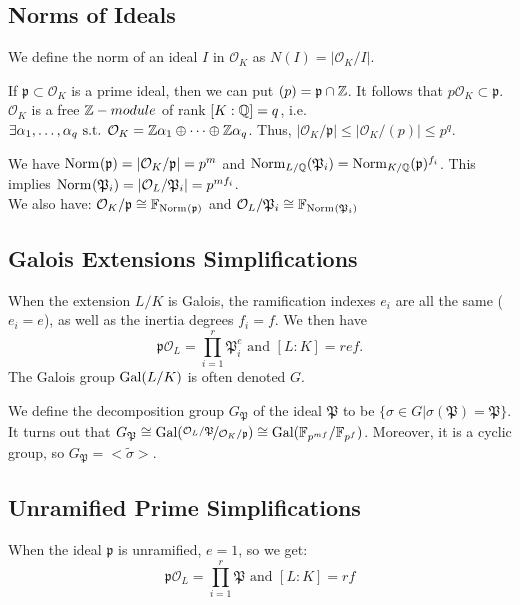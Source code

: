 \subsection{Norms of Ideals}
We define the norm of an ideal $I$ in $\mathcal{O}_K$ as $N(I)=|\mathcal{O}_K/I|$.

If $\mathfrak{p} \subset \mathcal{O}_K$ is a prime ideal, then we can put $(p)=\mathfrak{p} \cap \Z$.
It follows that $p\mathcal{O}_K \subset \mathfrak{p}$.
$\mathcal{O}_K$ is a free $\Z-module$ of rank $[K:\Q]=q$, i.e. $\exists \alpha_1,\dots,\alpha_q \text{ s.t. } \mathcal{O}_K=\Z \alpha_1 \oplus \cdots \oplus \Z \alpha_q$.
Thus, $|\mathcal{O}_K/\mathfrak{p}| \leq |\mathcal{O}_K/(p)| \leq p^q$.

We have 
$
\Norm{\mathfrak{p}} = |\mathcal{O}_K/\mathfrak{p}|=p^m
$
and 
$
\Norm[L/\Q]{\mathfrak{P}_i} = \Norm[K/\Q]{\mathfrak{p}}^{f_i}
$.
This implies 
$
\Norm{\mathfrak{P}_i} = |\mathcal{O}_L/\mathfrak{P}_i| = p^{mf_i}
$.\\
We also have: 
$
\mathcal{O}_K/\mathfrak{p} \cong \mathbb{F}_{\Norm{\mathfrak{p}}}
$
 and 
$
\mathcal{O}_L/\mathfrak{P}_i \cong \mathbb{F}_{\Norm{\mathfrak{P}_i}}
$

\subsection{Galois Extensions Simplifications}
When the extension $L/K$ is Galois, the ramification indexes $e_i$ are all the same ($e_i=e$), as well as the inertia degrees $f_i=f$.
We then have
$$
\mathfrak{p}\mathcal{O}_L = \prod_{i=1}^r \mathfrak{P}_i^{e}
\text{ and } [L:K] = ref.
$$
The Galois group $\Gal{L/K}$ is often denoted $G$.

We define the decomposition group $G_{\mathfrak{P}}$ of the ideal $\mathfrak{P}$ to be 
$
\{\sigma \in G | \sigma(\mathfrak{P})=\mathfrak{P} \}
$.
It turns out that 
$
G_{\mathfrak{P}} 
\cong \Gal{\nicefrac{\mathcal{O}_L/\mathfrak{P}}{\mathcal{O}_K/\mathfrak{p}}}
\cong \Gal{ \mathbb{F}_{p^{mf}}/\mathbb{F}_{p^{f}}}
$.
Moreover, it is a cyclic group, so 
$
G_{\mathfrak{P}} = <\tilde{\sigma}>
$.

\subsection{Unramified Prime Simplifications}
When the ideal $\mathfrak{p}$ is unramified, $e=1$, so we get:
$$
\mathfrak{p}\mathcal{O}_L 
= \prod_{i=1}^r \mathfrak{P} \text{ and } [L:K] = rf
$$

